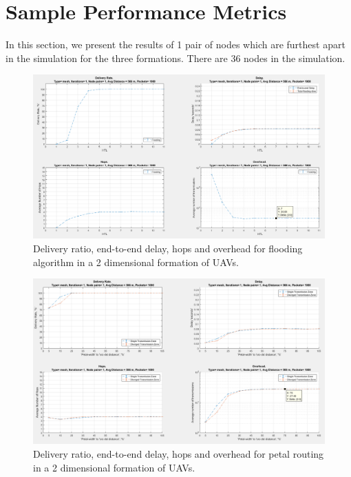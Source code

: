 \chapter{Sample Performance Metrics}

In this section, we present the results of 1 pair of nodes which are furthest apart in the simulation for the three formations. There are 36 nodes in the simulation.

\thispagestyle{lscapedplain}

\begin{landscape}
\begin{figure}
\centering
\includegraphics[width=1\textwidth]{ncsuthesis-0.6/Appendix-A/figs/flood_mesh}
\caption{Delivery ratio, end-to-end delay, hops and overhead for flooding algorithm in a 2 dimensional formation of UAVs.}
\label{fig:flood_mesh}
\end{figure}
\end{landscape}

\thispagestyle{lscapedplain}
\begin{landscape}
\begin{figure}
\centering
\includegraphics[width=1\textwidth]{ncsuthesis-0.6/Appendix-A/figs/petal_mesh.png}
\caption{Delivery ratio, end-to-end delay, hops and overhead for petal routing in a 2 dimensional formation of UAVs.}
\label{fig:petal_mesh}
\end{figure}
\end{landscape}


